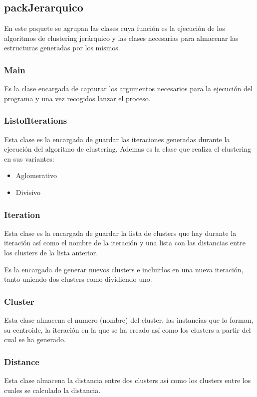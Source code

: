 \documentclass[11pt, titlepage,a4paper]{article}
\begin{document}
\subsection{packJerarquico}
En este paquete se agrupan las clases cuya función es la ejecución de los
algoritmos de clustering jerárquico y las clases necesarias para almacenar las
estructuras generadas por los mismos.

\subsubsection{Main}
Es la clase encargada de capturar los argumentos necesarios para la ejecución
del programa y una vez recogidos lanzar el proceso.
 
\subsubsection{ListofIterations}
Esta clase es la encargada de guardar las iteraciones generadas durante la
ejecución del algoritmo de clustering. Ademas es la clase que realiza el
clustering en sus variantes:
\begin{itemize}
  \item Aglomerativo
  \item Divisivo
\end{itemize}

\subsubsection{Iteration}
Esta clase es la encargada de guardar la lista de clusters que hay durante la
iteración así como el nombre de la iteración y una lista con las distancias
entre los clusters de la lista anterior.

Es la encargada de generar nuevos clusters e incluirlos en una nueva iteración,
tanto uniendo dos clusters como dividiendo uno.

\subsubsection{Cluster}
Esta clase almacena el numero (nombre) del cluster, las instancias que lo forman,
su centroide, la iteración en la que se ha creado así como los clusters a partir
del cual se ha generado.

\subsubsection{Distance}
Esta clase almacena la distancia entre dos clusters así como los clusters entre
los cuales se calculado la distancia.
\end{document}
